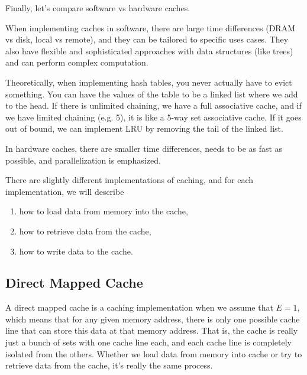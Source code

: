   Finally, let's compare software vs hardware caches. 

  \begin{definition}
    When implementing caches in software, there are large time differences (DRAM vs disk, local vs remote), and they can be tailored to specific uses cases. They also have flexible and sophisticated approaches with data structures (like trees) and can perform complex computation. 
  \end{definition}

  Theoretically, when implementing hash tables, you never actually have to evict something. You can have the values of the table to be a linked list where we add to the head. If there is unlimited chaining, we have a full associative cache, and if we have limited chaining (e.g. 5), it is like a 5-way set associative cache. If it goes out of bound, we can implement LRU by removing the tail of the linked list. 

  \begin{definition}
    In hardware caches, there are smaller time differences, needs to be as fast as possible, and parallelization is emphasized. 
  \end{definition}

  There are slightly different implementations of caching, and for each implementation, we will describe 
  \begin{enumerate}
    \item how to load data from memory into the cache, 
    \item how to retrieve data from the cache, 
    \item how to write data to the cache. 
  \end{enumerate}

\subsection{Direct Mapped Cache} 

  A direct mapped cache is a caching implementation when we assume that $E = 1$, which means that for any given memory address, there is only one possible cache line that can store this data at that memory address. That is, the cache is really just a bunch of sets with one cache line each, and each cache line is completely isolated from the others. Whether we load data from memory into cache or try to retrieve data from the cache, it's really the same process. 


